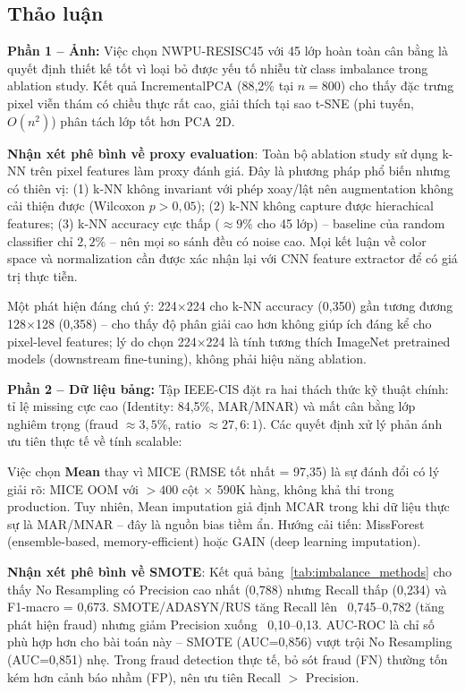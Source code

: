 \documentclass[12pt,a4paper]{article}
\let\oldtextbf\textbf
\renewcommand{\textbf}[1]{\oldtextbf{\textcolor{hcmublue}{#1}}}
\begin{document}
\subsection{Thảo luận}

\textbf{Phần 1 -- Ảnh:}
Việc chọn NWPU-RESISC45 với 45 lớp hoàn toàn cân bằng là quyết định thiết kế tốt vì loại bỏ được yếu tố nhiễu từ class imbalance trong ablation study. Kết quả IncrementalPCA (88{,}2\% tại $n=800$) cho thấy đặc trưng pixel viễn thám có chiều thực rất cao, giải thích tại sao t-SNE (phi tuyến, $O(n^2)$) phân tách lớp tốt hơn PCA 2D.

\textbf{Nhận xét phê bình về proxy evaluation}: Toàn bộ ablation study sử dụng k-NN trên pixel features làm proxy đánh giá. Đây là phương pháp phổ biến nhưng có thiên vị: (1) k-NN không invariant với phép xoay/lật nên augmentation không cải thiện được (Wilcoxon $p > 0{,}05$); (2) k-NN không capture được hierachical features; (3) k-NN accuracy cực thấp ($\approx 9\%$ cho 45 lớp) -- baseline của random classifier chỉ $2{,}2\%$ -- nên mọi so sánh đều có noise cao. Mọi kết luận về color space và normalization cần được xác nhận lại với CNN feature extractor để có giá trị thực tiễn.

Một phát hiện đáng chú ý: 224$\times$224 cho k-NN accuracy (0{,}350) gần tương đương 128$\times$128 (0{,}358) -- cho thấy độ phân giải cao hơn không giúp ích đáng kể cho pixel-level features; lý do chọn 224$\times$224 là tính tương thích ImageNet pretrained models (downstream fine-tuning), không phải hiệu năng ablation.

\textbf{Phần 2 -- Dữ liệu bảng:}
Tập IEEE-CIS đặt ra hai thách thức kỹ thuật chính: tỉ lệ missing cực cao (Identity: 84,5\%, MAR/MNAR) và mất cân bằng lớp nghiêm trọng (fraud $\approx 3{,}5\%$, ratio $\approx 27{,}6:1$). Các quyết định xử lý phản ánh ưu tiên thực tế về tính scalable:

Việc chọn \textbf{Mean} thay vì MICE (RMSE tốt nhất = 97{,}35) là sự đánh đổi có lý giải rõ: MICE OOM với $>400$ cột $\times$ 590K hàng, không khả thi trong production. Tuy nhiên, Mean imputation giả định MCAR trong khi dữ liệu thực sự là MAR/MNAR -- đây là nguồn bias tiềm ẩn. Hướng cải tiến: MissForest (ensemble-based, memory-efficient) hoặc GAIN (deep learning imputation).

\textbf{Nhận xét phê bình về SMOTE}: Kết quả bảng~\ref{tab:imbalance_methods} cho thấy No Resampling có Precision cao nhất (0{,}788) nhưng Recall thấp (0{,}234) và F1-macro = 0{,}673. SMOTE/ADASYN/RUS tăng Recall lên ~0{,}745--0{,}782 (tăng phát hiện fraud) nhưng giảm Precision xuống ~0{,}10--0{,}13. AUC-ROC là chỉ số phù hợp hơn cho bài toán này -- SMOTE (AUC=0{,}856) vượt trội No Resampling (AUC=0{,}851) nhẹ. Trong fraud detection thực tế, bỏ sót fraud (FN) thường tốn kém hơn cảnh báo nhầm (FP), nên ưu tiên Recall $>$ Precision.
\end{document}
